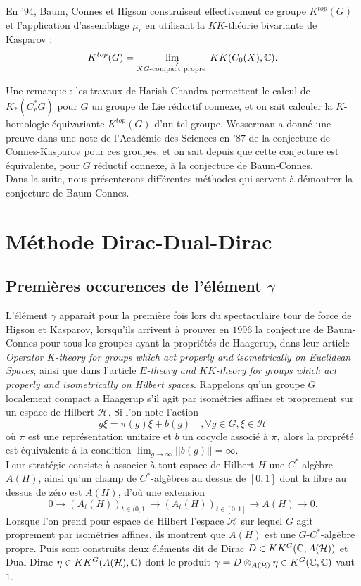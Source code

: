 En '$94$, Baum, Connes et Higson construisent effectivement ce groupe $K^{top}(G)$ et l'application d'assemblage $\mu_r$ en utilisant la $KK$-théorie bivariante de Kasparov : 
\[K^{top}(G)=\varinjlim_{X G\text{-compact propre }} KK(C_0(X), \mathbb C).\]

Une remarque : les travaux de Harish-Chandra permettent le calcul de $K_*(C^*_r G)$ pour $G$ un groupe de Lie réductif connexe, et on sait calculer la $K$-homologie équivariante $K^{top}(G)$ d'un tel groupe. Wasserman a donné une preuve dans une note de l'Académie des Sciences en '$87$ de la conjecture de Connes-Kasparov pour ces groupes, et on sait depuis que cette conjecture est équivalente, pour $G$ réductif connexe, à la conjecture de Baum-Connes.\\

Dans la suite, nous présenterons différentes méthodes qui servent à démontrer la conjecture de Baum-Connes.\\

\section{Méthode Dirac-Dual-Dirac}

\subsection{Premières occurences de l'élément $\gamma$}

L'élément $\gamma$ apparaît pour la première fois lors du spectaculaire tour de force de Higson et Kasparov, lorsqu'ils arrivent à prouver en $1996$ la conjecture de Baum-Connes pour tous les groupes ayant la propriétés de Haagerup, dans leur article \textit{Operator $K$-theory for groups which act properly and isometrically on Euclidean Spaces}, ainsi que dans l'article
\textit{$E$-theory and $KK$-theory for groups which act properly and isometrically on Hilbert spaces}.\cite{HigsonKasparov} Rappelons qu'un groupe $G$ localement compact a Haagerup s'il agit par isométries affines et proprement sur un espace de Hilbert $\mathcal H$. Si l'on note l'action
\[g\xi = \pi(g)\xi + b(g) \quad,\forall g\in G ,\xi\in \mathcal H\]
où $\pi$ est une représentation unitaire et $b$ un cocycle associé à $\pi$, alors la proprété est équivalente à la condition $\lim_{g\rightarrow\infty} ||b(g)||=\infty$.\\

Leur stratégie consiste à associer à tout espace de Hilbert $H$ une $C^*$-algèbre $A(H)$, ainsi qu'un champ de $C^*$-algèbres au dessus de $[0,1]$ dont la fibre au dessus de zéro est $A(H)$, d'où une extension
\[0\rightarrow (A_t(H))_{t\in (0,1]}\rightarrow (A_t(H))_{t\in [0,1]}\rightarrow A(H)\rightarrow 0.\]
Lorsque l'on prend pour espace de Hilbert l'espace $\mathcal H$ sur lequel $G$ agit proprement par isométries affines, ils montrent que $A(H)$ est une $G$-$C^*$-algèbre propre. Puis sont construits deux éléments dit de Dirac $D\in KK^G(\mathbb C,A(\mathcal H))$ et Dual-Dirac $\eta\in KK^G(A(\mathcal H),\mathbb C)$ dont le produit $\gamma = D\otimes_{A(\mathcal H)}\eta\in K^G(\mathbb C,\mathbb C)$ vaut $1$. \\

